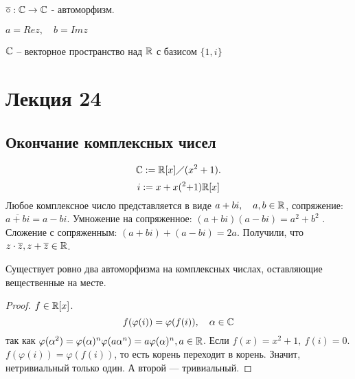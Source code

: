 \documentclass[12pt]{report}
\begin{document}
   $\overline{\circ} :\mathbb{C} \to  \mathbb{C}$  - автоморфизм.

   $a = Re z, \quad b = Im z$
   
   $\mathbb{C}$ -- векторное пространство над $\mathbb{R}$ с базисом $\{1, i\}$

\section{Лекция 24}
\subsection{Окончание комплексных чисел}
   \[
       \mathbb{C} := \mathbb{R}[x] \diagup (x^2 + 1)
   .\] 
   $$i := x + x(^2+1)\mathbb{R}[x]$$
   Любое комплексное число представляется в виде $a + bi, \quad a, b \in \mathbb{R}$, сопряжение: $\overline{a+ bi} = a - bi$.
   Умножение на сопряженное: $(a+bi) (a-bi) = a^2 + b^2$ .
   Сложение с сопряженным: $(a+bi) + (a-bi) = 2a$.
   Получили, что $z \cdot \overline{z} , z + \overline{z} \in \mathbb{R}$.

   \begin{st}
       Существует ровно два автоморфизма на комплексных числах, оставляющие вещественные на месте.
   \end{st}
   \begin{proof}
       $f \in  \mathbb{R}[x]$.
       \[
	   f( \varphi (i)) = \varphi  (f(i)), \quad \alpha \in  \mathbb{C}
       \]  
       так как $\varphi ( \alpha ^2)  = \varphi ( \alpha )^n \\
       \varphi (a \alpha ^n) = a \varphi ( \alpha )^n, a \in  \mathbb{R}$.
       Если $f(x) = x^2 + 1, ~ f(i) = 0$. 
       $f( \varphi (i)) = \varphi (f(i))$, то есть корень переходит в корень. Значит, нетривиальный только один.
       А второй --- тривиальный.
   \end{proof}
\end{document}

